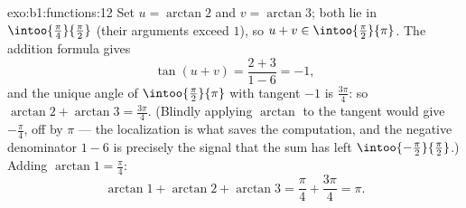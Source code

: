 \begin{solution}{exo:b1:functions:12}
Set $u = \arctan 2$ and $v = \arctan 3$; both lie in
$\intoo{\frac\pi4}{\frac\pi2}$ (their arguments exceed $1$), so $u
+ v \in \intoo{\frac\pi2}{\pi}$. The addition formula gives
\[
\tan(u + v) = \frac{2 + 3}{1 - 6} = -1 ,
\]
and the unique angle of $\intoo{\frac\pi2}{\pi}$ with tangent $-1$
is $\frac{3\pi}4$: so $\arctan 2 + \arctan 3 = \frac{3\pi}4$.
(Blindly applying $\arctan$ to the tangent would give
$-\frac\pi4$, off by $\pi$ --- the localization is what saves the
computation, and the negative denominator $1 - 6$ is precisely the
signal that the sum has left
$\intoo{-\frac\pi2}{\frac\pi2}$.) Adding $\arctan 1 = \frac\pi4$:
\[
\arctan 1 + \arctan 2 + \arctan 3 = \frac\pi4 + \frac{3\pi}4 = \pi .
\]
\end{solution}

